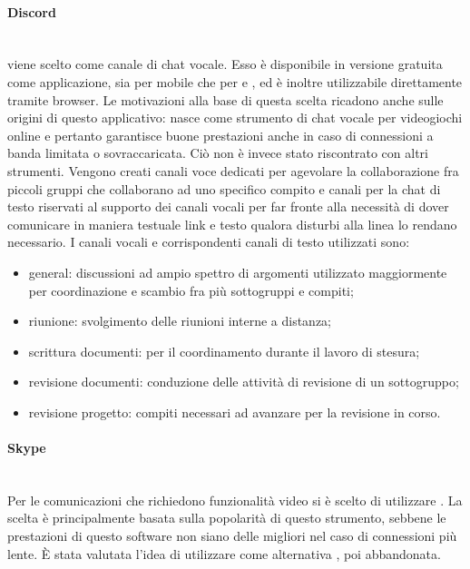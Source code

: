 \paragraph{Discord}\mbox{}\\
 viene scelto come canale di chat vocale. Esso è disponibile in versione gratuita come applicazione, sia per mobile che per  e , ed è inoltre utilizzabile direttamente tramite browser. Le motivazioni alla base di questa scelta ricadono anche sulle origini di questo applicativo:  nasce come strumento di chat vocale per videogiochi online e pertanto garantisce buone prestazioni anche in caso di connessioni a banda limitata o sovraccaricata. Ciò non è invece stato riscontrato con altri strumenti.
Vengono creati canali voce dedicati per agevolare la collaborazione fra piccoli gruppi che collaborano ad uno specifico compito e canali per la chat di testo riservati al supporto dei canali vocali per far fronte alla necessità di dover comunicare in maniera testuale link e testo qualora disturbi alla linea lo rendano necessario.
I canali vocali e corrispondenti canali di testo utilizzati sono:
\begin{itemize}
	\item general: discussioni ad ampio spettro di argomenti utilizzato maggiormente per coordinazione e scambio fra più sottogruppi e compiti;
	\item riunione: svolgimento delle riunioni interne a distanza;
	\item scrittura documenti: per il coordinamento durante il lavoro di stesura;
	\item revisione documenti: conduzione delle attività di revisione di un sottogruppo;
	\item revisione progetto: compiti necessari ad avanzare per la revisione in corso.
\end{itemize}


\paragraph{Skype}\mbox{}\\
Per le comunicazioni che richiedono funzionalità video si è scelto di utilizzare . La scelta è principalmente basata sulla popolarità di questo strumento, sebbene le prestazioni di questo software non siano delle migliori nel caso di connessioni più lente. \`{E} stata valutata l'idea di utilizzare come alternativa , poi abbandonata.

